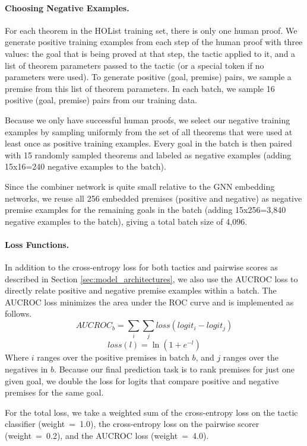 \documentclass[letterpaper]{article} \usepackage{aaai20}  \usepackage{times}  \usepackage{helvet} \usepackage{courier}  \usepackage[hyphens]{url}  \usepackage{graphicx} \urlstyle{rm} \def\UrlFont{\rm}  \usepackage{graphicx}  \frenchspacing  \setlength{\pdfpagewidth}{8.5in}  \setlength{\pdfpageheight}{11in}
\newcommand{\citep}{\cite}
\begin{document}
\paragraph{Choosing Negative Examples.}
For each theorem in the HOList training set, there is only one human proof.  We generate positive training examples from each step of the human proof with three values: the goal that is being proved at that step, the tactic applied to it, and a list of theorem parameters passed to the tactic (or a special token if no parameters were used).  To generate positive (goal, premise) pairs, we sample a premise from this list of theorem parameters.  In each batch, we sample 16 positive (goal, premise) pairs from our training data.

Because we only have successful human proofs, we select our negative training examples by sampling uniformly from the set of all theorems that were used at least once as positive training examples.  Every goal in the batch is then paired with 15 randomly sampled theorems and labeled as negative examples (adding 15x16=240 negative examples to the batch).

Since the combiner network is quite small relative to the GNN embedding networks, we reuse all 256 embedded premises (positive and negative) as negative premise examples for the remaining goals in the batch (adding 15x256=3,840 negative examples to the batch), giving a total batch size of 4,096. 

\paragraph{Loss Functions.}
In addition to the cross-entropy loss for both tactics and pairwise scores as described in Section \ref{sec:model_architectures}, we also use the AUCROC loss \citep{burges2005learning,eban2016scalable} to directly relate positive and negative premise examples within a batch.
The AUCROC loss minimizes the area under the ROC curve and is implemented as follows.
$$AUCROC_b = \sum_{i} \sum_{j} loss(logit_i - logit_j)$$
$$loss(l) = \ln(1 + e^{-l})$$ Where $i$ ranges over the positive premises in batch $b$, and $j$ ranges over the negatives in $b$.  Because our final prediction task is to rank premises for just one given goal, we double the loss for logits that compare positive and negative premises for the same goal.

For the total loss, we take a weighted sum of the cross-entropy loss on the tactic classifier (weight~=~1.0), the cross-entropy loss on the pairwise scorer (weight~=~0.2), and the AUCROC loss (weight~=~4.0).
\end{document}
